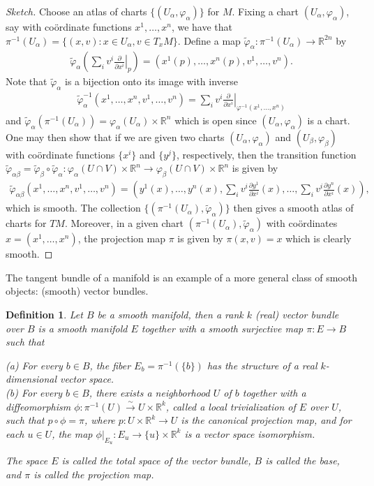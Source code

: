 \documentclass{amsart}          %
\newtheorem{definition}[theorem]{Definition}
\newcommand{\R}{\mathbb R}
\newcommand{\pdiff}[2]{\frac{\partial #1}{\partial #2}}
\begin{document}
\begin{proof}[Sketch]
	Choose an atlas of charts $\{(U_\alpha,\varphi_\alpha)\}$ for $M$. Fixing a chart $(U_\alpha,\varphi_\alpha)$, say with co\"{o}rdinate functions $x^1,\dots,x^n$, we have that $\pi^{-1}(U_\alpha)=\{(x,v):x\in U_\alpha,v\in T_xM\}$. Define a map $\widetilde{\varphi}_\alpha:\pi^{-1}(U_\alpha)\to\R^{2n}$ by\begin{align*}
	\widetilde{\varphi}_\alpha\left(\sum_{i}v^i\left.\pdiff{}{x^i}\right|_p\right)=\left(x^1(p),\dots,x^n(p),v^1,\dots,v^n\right).
	\end{align*}Note that $\widetilde{\varphi}_\alpha$ is a bijection onto its image with inverse\begin{align*}
	\widetilde{\varphi}^{-1}_\alpha\left(x^1,\dots,x^n,v^1,\dots,v^n\right)=\sum_{i}v^i\left.\pdiff{}{x^i}\right|_{\varphi^{-1}(x^1,\dots,x^n)}
	\end{align*} and $\widetilde{\varphi}_\alpha(\pi^{-1}(U_\alpha))=\varphi_\alpha(U_\alpha)\times\R^n$ which is open since $(U_\alpha,\varphi_\alpha)$ is a chart. One may then show that if we are given two charts $(U_\alpha,\varphi_\alpha)$ and $(U_\beta,\varphi_\beta)$ with co\"{o}rdinate functions $\{x^i\}$ and $\{y^j\}$, respectively, then the transition function $\widetilde{\varphi}_{\alpha\beta}=\widetilde{\varphi}_\beta\circ\widetilde{\varphi}_\alpha:\varphi_\alpha(U\cap V)\times\R^n\to\varphi_\beta(U\cap V)\times\R^n$ is given by\begin{align*}
	\widetilde{\varphi}_{\alpha\beta}\left(x^1,\dots,x^n,v^1,\dots,v^n\right)=\left(y^1(x),\dots,y^n(x),\sum_{i}v^i\pdiff{y^1}{x^i}(x),\dots,\sum_{i}v^i\pdiff{y^n}{x^i}(x)\right),
	\end{align*}which is smooth. The collection $\{(\pi^{-1}(U_\alpha),\widetilde{\varphi}_\alpha)\}$ then gives a smooth atlas of charts for $TM$. Moreover, in a given chart $(\pi^{-1}(U_\alpha),\widetilde{\varphi}_\alpha)$ with co\"{o}rdinates $x=(x^1,\dots,x^n)$, the projection map $\pi$ is given by $\pi(x,v)=x$ which is clearly smooth.
\end{proof}
The tangent bundle of a manifold is an example of a more general class of smooth objects: (smooth) vector bundles.
\begin{definition}
	Let $B$ be a smooth manifold, then a \textit{rank $k$ (real) vector bundle over $B$} is a smooth manifold $E$ together with a smooth surjective map $\pi:E\to B$ such that\begin{flushleft}
		\textup{(a)} For every $b\in B$, the \textup{fiber} $E_b=\pi^{-1}(\{b\})$ has the structure of a real $k$-dimensional vector space.\\
		\textup{(b)} For every $b\in B$, there exists a neighborhood $U$ of $b$ together with a diffeomorphism $\phi:\pi^{-1}(U)\stackrel{\sim}{\to}U\times\R^k$, called a \textit{local trivialization of $E$ over $U$}, such that $p\circ\phi=\pi$, where $p:U\times\R^k\to U$ is the canonical projection map, and for each $u\in U$, the map $\left.\phi\right|_{E_u}:E_u\to\{u\}\times\R^k$ is a vector space isomorphism.
	\end{flushleft}
The space $E$ is called the \textit{total space} of the vector bundle, $B$ is called the \textit{base}, and $\pi$ is called the \textit{projection map}.
\end{definition}
\end{document}
